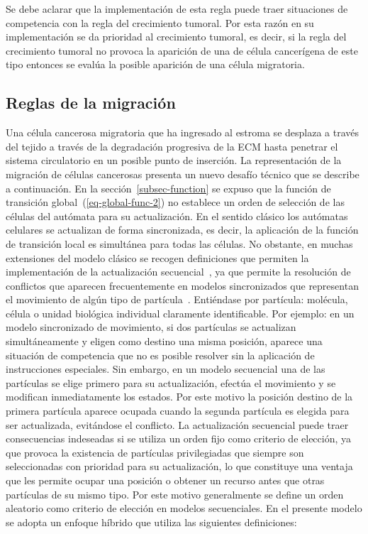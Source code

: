 Se debe aclarar que la implementaci\'on de esta regla puede traer situaciones de competencia con la regla del crecimiento tumoral. Por esta raz\'on en su implementaci\'on se da prioridad al crecimiento tumoral, es decir, si la regla del crecimiento tumoral no provoca la aparici\'on de una de c\'elula cancer\'igena de este tipo entonces se eval\'ua la posible aparici\'on de una c\'elula migratoria.

\subsection{Reglas de la migraci\'on}
\label{subsec-migration}
Una célula cancerosa migratoria que ha ingresado al estroma se desplaza a través del tejido a través de la degradación progresiva de la ECM hasta penetrar el sistema circulatorio en un posible punto de inserción. La representación de la migración de células cancerosas presenta un nuevo desafío técnico que se describe a continuación. En la secci\'on~\ref{subsec-function} se expuso que la funci\'on de transici\'on global~(\ref{eq-global-func-2}) no establece un orden de selecci\'on de las c\'elulas del aut\'omata para su actualizaci\'on. En el sentido cl\'asico los aut\'omatas celulares se actualizan de forma sincronizada, es decir, la aplicaci\'on de la funci\'on de transici\'on local es simult\'anea para todas las c\'elulas. No obstante, en muchas extensiones del modelo cl\'asico se recogen definiciones que permiten la implementaci\'on de la actualizaci\'on secuencial~\cite{book}, ya que permite la resoluci\'on de conflictos que aparecen frecuentemente en modelos sincronizados que representan el movimiento de alg\'un tipo de part\'icula~\cite{book}. Enti\'endase por part\'icula: mol\'ecula, c\'elula o unidad biol\'ogica individual claramente identificable. Por ejemplo: en un modelo sincronizado de movimiento, si dos part\'iculas se actualizan simult\'aneamente y eligen como destino una misma posici\'on, aparece una situaci\'on de competencia que no es posible resolver sin la aplicaci\'on de instrucciones especiales. Sin embargo, en un modelo secuencial una de las part\'iculas se elige primero para su actualizaci\'on, efect\'ua el movimiento y se modifican inmediatamente los estados. Por este motivo la posici\'on destino de la primera part\'icula aparece ocupada cuando la segunda part\'icula es elegida para ser actualizada, evit\'andose el conflicto. La actualizaci\'on secuencial puede traer consecuencias indeseadas si se utiliza un orden fijo como criterio de elecci\'on, ya que provoca la existencia de part\'iculas privilegiadas que siempre son seleccionadas con prioridad para su actualizaci\'on, lo que constituye una ventaja que les permite ocupar una posici\'on o obtener un recurso antes que otras part\'iculas de su mismo tipo. Por este motivo generalmente se define un orden aleatorio como criterio de elecci\'on en modelos secuenciales. En el presente modelo se adopta un enfoque h\'ibrido que utiliza las siguientes definiciones:

